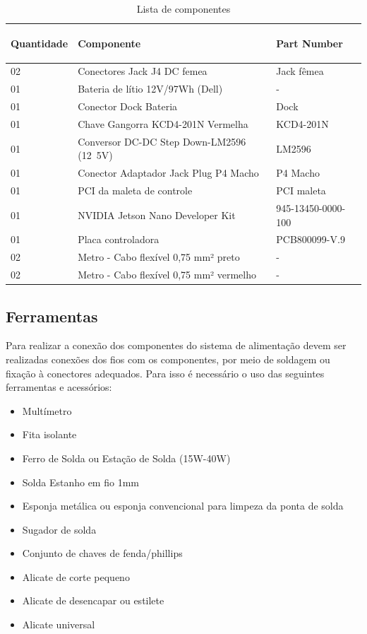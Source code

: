 \begin{table}[H]
\centering
\begin{tabular}{|m{1.8cm} |m{9.2cm}|m{4cm}|}
\hline
\begin{center}Quantidade\end{center} & \begin{center}Componente\end{center} &\begin{center} Part Number\end{center} \\\hline
 02&Conectores Jack J4 DC femea& Jack fêmea \\\hline
 01 & Bateria de lítio 12V/97Wh (Dell) & - \\\hline
 01 & Conector Dock Bateria & Dock \\\hline
 01 & Chave Gangorra KCD4-201N Vermelha & KCD4-201N \\\hline
 01 &  Conversor DC-DC Step Down-LM2596 (12~5V)
& LM2596 \\\hline
 01 & Conector Adaptador Jack Plug P4 Macho &  P4 Macho \\\hline
01& PCI da maleta de controle & PCI maleta \\\hline
01 & NVIDIA Jetson Nano Developer Kit  & 945-13450-0000-100 \\\hline
01 &Placa controladora   & PCB800099-V.9  \\\hline
02 &Metro - Cabo flexível 0,75 mm² preto & - \\\hline
02& Metro - Cabo flexível 0,75 mm² vermelho & - \\\hline


\end{tabular}
\caption{Lista de componentes}
\end{table}

\subsection*{Ferramentas}

\par Para realizar a conexão dos componentes do sistema de alimentação devem ser realizadas conexões dos fios com os componentes, por meio de soldagem ou fixação à conectores adequados. Para isso é necessário o uso das seguintes ferramentas e acessórios:
	
    		  
\begin{itemize}
    \item Multímetro
    \item Fita isolante
    \item Ferro de Solda ou Estação de Solda (15W-40W)
    \item Solda Estanho em fio 1mm
    \item Esponja metálica ou esponja convencional para limpeza da ponta de solda
    \item Sugador de solda
    \item Conjunto de chaves de fenda/phillips
    \item Alicate de corte pequeno
    \item Alicate de desencapar ou estilete
	\item Alicate universal
\end{itemize}



